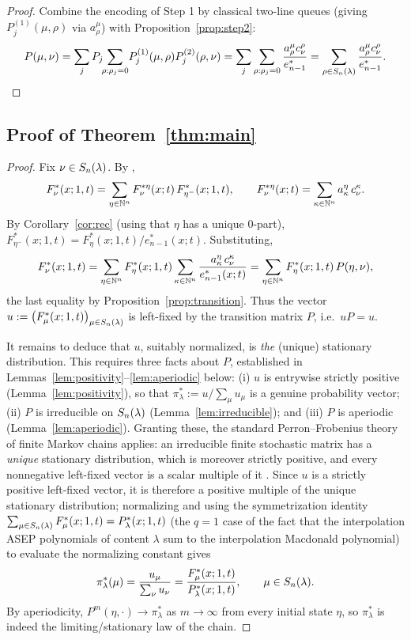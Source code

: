 \begin{proof}
Combine the encoding of Step 1 by classical two-line queues
\cite[Lem.~5.4]{AMW25} (giving $P^{(1)}_j(\mu,\rho)$ via $a^\mu_\rho$) with
Proposition~\ref{prop:step2}:
\[
P(\mu,\nu)=\sum_j P_j\!\!\sum_{\rho:\rho_j=0}\!P^{(1)}_j(\mu,\rho)P^{(2)}_j(\rho,\nu)
=\sum_j\sum_{\rho:\rho_j=0}\frac{a^\mu_\rho c^\rho_\nu}{e^*_{n-1}}
=\sum_{\rho\in S_n(\lambda)}\frac{a^\mu_\rho c^\rho_\nu}{e^*_{n-1}}.
\]
\end{proof}

\subsection*{Proof of Theorem~\ref{thm:main}}

\begin{proof}
Fix $\nu\in S_n(\lambda)$. By \cite[Thm.~1.15, Lem.~5.6]{BDW25a},
\[
F^*_\nu(x;1,t)=\sum_{\eta\in\mathbb{N}^n}F^{*\eta}_\nu(x;t)\,F^*_{\eta^-}(x;1,t),
\qquad
F^{*\eta}_\nu(x;t)=\sum_{\kappa\in\mathbb{N}^n}a^\eta_\kappa\,c^\kappa_\nu .
\]
By Corollary~\ref{cor:rec} (using that $\eta$ has a unique $0$-part),
$F^*_{\eta^-}(x;1,t)=F^*_\eta(x;1,t)/e^*_{n-1}(x;t)$. Substituting,
\[
F^*_\nu(x;1,t)=\sum_{\eta\in\mathbb{N}^n}F^*_\eta(x;1,t)\sum_{\kappa\in\mathbb{N}^n}
\frac{a^\eta_\kappa\,c^\kappa_\nu}{e^*_{n-1}(x;t)}
=\sum_{\eta\in\mathbb{N}^n}F^*_\eta(x;1,t)\,P(\eta,\nu),
\]
the last equality by Proposition~\ref{prop:transition}. Thus the vector
$u:=\bigl(F^*_\mu(x;1,t)\bigr)_{\mu\in S_n(\lambda)}$ is left-fixed by the transition
matrix $P$, i.e.\ $uP=u$.

It remains to deduce that $u$, suitably normalized, is \emph{the} (unique)
stationary distribution. This requires three facts about $P$, established in
Lemmas~\ref{lem:positivity}--\ref{lem:aperiodic} below: (i) $u$ is entrywise
strictly positive (Lemma~\ref{lem:positivity}), so that $\pi^*_\lambda:=u/\!\sum_\mu u_\mu$
is a genuine probability vector; (ii) $P$ is irreducible on $S_n(\lambda)$
(Lemma~\ref{lem:irreducible}); and (iii) $P$ is aperiodic
(Lemma~\ref{lem:aperiodic}). Granting these, the standard Perron--Frobenius theory
of finite Markov chains applies: an irreducible finite stochastic matrix has a
\emph{unique} stationary distribution, which is moreover strictly positive, and
every nonnegative left-fixed vector is a scalar multiple of it
\cite[Thm.~1.5.6, Thm.~1.7.7]{Norris}. Since $u$ is a strictly positive
left-fixed vector, it is therefore a positive multiple of the unique stationary
distribution; normalizing and using the symmetrization identity
$\sum_{\mu\in S_n(\lambda)}F^*_\mu(x;1,t)=P^*_\lambda(x;1,t)$ (the $q=1$ case of the
fact that the interpolation ASEP polynomials of content $\lambda$ sum to the
interpolation Macdonald polynomial) to evaluate the normalizing constant gives
\[
\pi^*_\lambda(\mu)=\frac{u_\mu}{\sum_{\nu}u_\nu}
=\frac{F^*_\mu(x;1,t)}{P^*_\lambda(x;1,t)},\qquad \mu\in S_n(\lambda) .
\]
By aperiodicity, $P^m(\eta,\cdot)\to\pi^*_\lambda$ as $m\to\infty$ from every
initial state $\eta$, so $\pi^*_\lambda$ is indeed the limiting/stationary law of
the chain.
\end{proof}

